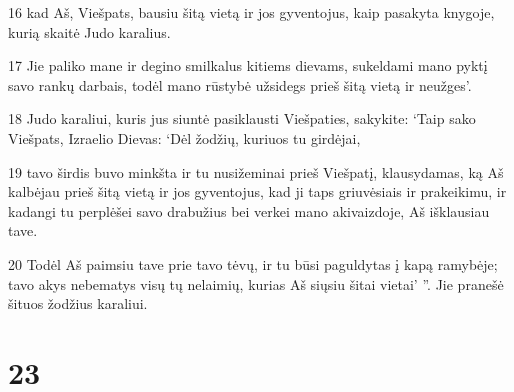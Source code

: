 \par 16 kad Aš, Viešpats, bausiu šitą vietą ir jos gyventojus, kaip pasakyta knygoje, kurią skaitė Judo karalius. 
\par 17 Jie paliko mane ir degino smilkalus kitiems dievams, sukeldami mano pyktį savo rankų darbais, todėl mano rūstybė užsidegs prieš šitą vietą ir neužges’. 
\par 18 Judo karaliui, kuris jus siuntė pasiklausti Viešpaties, sakykite: ‘Taip sako Viešpats, Izraelio Dievas: ‘Dėl žodžių, kuriuos tu girdėjai, 
\par 19 tavo širdis buvo minkšta ir tu nusižeminai prieš Viešpatį, klausydamas, ką Aš kalbėjau prieš šitą vietą ir jos gyventojus, kad ji taps griuvėsiais ir prakeikimu, ir kadangi tu perplėšei savo drabužius bei verkei mano akivaizdoje, Aš išklausiau tave. 
\par 20 Todėl Aš paimsiu tave prie tavo tėvų, ir tu būsi paguldytas į kapą ramybėje; tavo akys nebematys visų tų nelaimių, kurias Aš siųsiu šitai vietai’ ”. Jie pranešė šituos žodžius karaliui.



\chapter{23}

